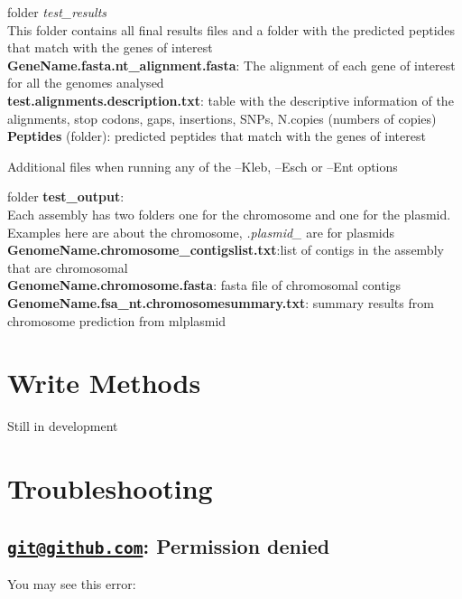 \documentclass[
]{book}
\begin{document}
folder \emph{test\_results}\\
This folder contains all final results files and a folder with the predicted peptides that match with the genes of interest\\
\textbf{GeneName.fasta.nt\_alignment.fasta}: The alignment of each gene of interest for all the genomes analysed\\
\textbf{test.alignments.description.txt}: table with the descriptive information of the alignments, stop codons, gaps, insertions, SNPs, N.copies (numbers of copies)\\
\textbf{Peptides} (folder): predicted peptides that match with the genes of interest

Additional files when running any of the --Kleb, --Esch or --Ent options

folder \textbf{test\_output}:\\
Each assembly has two folders one for the chromosome and one for the plasmid. Examples here are about the chromosome, \emph{.plasmid\_} are for plasmids\\
\textbf{GenomeName.chromosome\_contigslist.txt}:list of contigs in the assembly that are chromosomal\\
\textbf{GenomeName.chromosome.fasta}: fasta file of chromosomal contigs\\
\textbf{GenomeName.fsa\_nt.chromosomesummary.txt}: summary results from chromosome prediction from mlplasmid

\hypertarget{write-methods}{%
\chapter{Write Methods}\label{write-methods}}

Still in development

\hypertarget{troubleshooting}{%
\chapter{Troubleshooting}\label{troubleshooting}}

\hypertarget{gitgithub.com-permission-denied}{%
\section{\texorpdfstring{\href{mailto:git@github.com}{\nolinkurl{git@github.com}}: Permission denied}{git@github.com: Permission denied}}\label{gitgithub.com-permission-denied}}

You may see this error:
\end{document}
